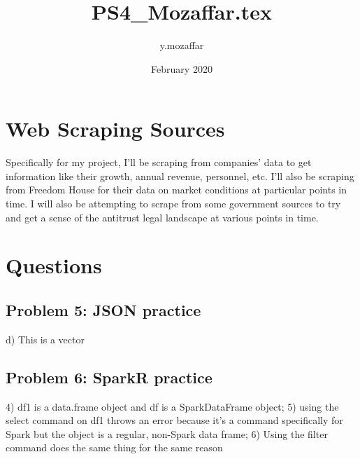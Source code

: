 \documentclass{article} \usepackage[utf8]{inputenc}
\title{PS4_Mozaffar.tex} \author{y.mozaffar } \date{February 2020}
\begin{document}
 \maketitle \section{Web Scraping Sources} Specifically 
for my project, I'll be scraping from companies' data to get information 
like their growth, annual revenue, personnel, etc. I'll also be scraping 
from Freedom House for their data on market conditions at particular 
points in time. I will also be attempting to scrape from some government 
sources to try and get a sense of the antitrust legal landscape at 
various points in time. \section{Questions} \subsection{Problem 5: JSON 
practice} d) This is a vector \subsection{Problem 6: SparkR practice} 4) 
df1 is a data.frame object and df is a SparkDataFrame object; 5) using 
the select command on df1 throws an error because it's a command 
specifically for Spark but the object is a regular, non-Spark data 
frame; 6) Using the filter command does the same thing for the same 
reason 
\end{document}
